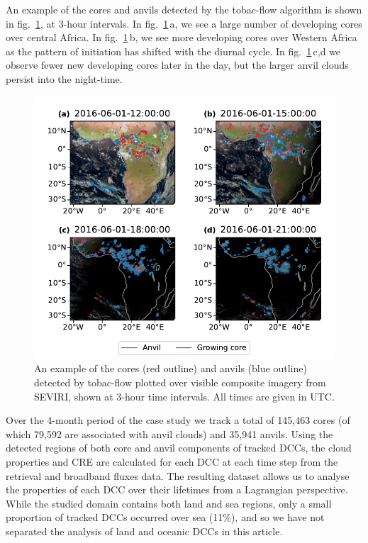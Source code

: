 \documentclass[acp, manuscript]{copernicus}
\begin{document}
An example of the cores and anvils detected by the tobac-flow algorithm is shown in fig.~\ref{fig:seviri_detection}, at 3-hour intervals. In fig.~\ref{fig:seviri_detection}\,a, we see a large number of developing cores over central Africa. 
In fig.~\ref{fig:seviri_detection}\,b, we see more developing cores over Western Africa as the pattern of initiation has shifted with the diurnal cycle.
In fig.~\ref{fig:seviri_detection}\,c,d we observe fewer new developing cores later in the day, but the larger anvil clouds persist into the night-time.


\begin{figure}[tp]
    \includegraphics[width=12cm]{figures/fig04.pdf}
    \caption[
    An example of the cores and anvils (detected by tobac-flow, shown at 3-hour time intervals
    ]{
    An example of the cores (red outline) and anvils (blue outline) detected by tobac-flow plotted over visible composite imagery from SEVIRI, shown at 3-hour time intervals. All times are given in UTC.
    }
    \label{fig:seviri_detection}
\end{figure}


Over the 4-month period of the case study we track a total of 145,463 cores (of which 79,592 are associated with anvil clouds) and 35,941 anvils. 
Using the detected regions of both core and anvil components of tracked DCCs, the cloud properties and CRE are calculated for each DCC at each time step from the retrieval and broadband fluxes data. 
The resulting dataset allows us to analyse the properties of each DCC over their lifetimes from a Lagrangian perspective.
While the studied domain contains both land and sea regions, only a small proportion of tracked DCCs occurred over sea (11\%), and so we have not separated the analysis of land and oceanic DCCs in this article.
\end{document}
